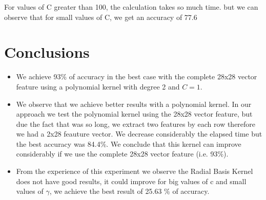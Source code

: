 \documentclass[11pt,a4paper]{article}
\begin{document}
For values of C greater than 100, the calculation takes so much time. but we can observe that for small values of C, we get an accuracy of 77.6%

\newpage

\section{Conclusions}

\begin{itemize}
	\item We achieve 93\% of accuracy in the best case with the complete 28x28 vector feature using a polynomial kernel with degree 2 and $C=1$.

	\item We observe that we achieve better results with a polynomial kernel. In our approach we test the polynomial kernel using the 28x28 vector feature, but due the fact that was so long, we extract two features by each row therefore we had a 2x28 feauture vector. We decrease considerably the elapsed time but the best accuracy was 84.4\%. We conclude that this kernel can improve considerably if we use the complete 28x28 vector feature (i.e. 93\%). 

	\item From the experience of this experiment we observe the Radial Basis Kernel does not have good results, it could improve for big values of c and small values of $\gamma$, we achieve the best result of 25.63 \% of accuracy.   
\end{itemize}	  
	      
\end{document}
